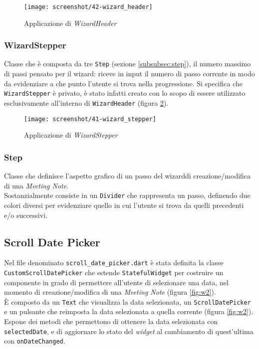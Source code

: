 \begin{figure}[!h] 
    \centering 
    \texttt{[image: screenshot/42-wizard\_header]} 
    \caption{Applicazione di \emph{WizardHeader}}
    \label{fig:wizard-header}
\end{figure}

\subsubsection*{WizardStepper}
\label{subsubsec:wizard-stepper}

Classe che è composta da tre \lstinline{Step} (sezione \ref{subsubsec:step}), il numero massimo di passi pensato per il \gls{wizard}\glsoccur: riceve in input il numero di passo corrente in modo da evidenziare a che punto l'utente si trova nella progressione.
Si specifica che \lstinline{WizardStepper} è privato, è stato infatti creato con lo scopo di essere utilizzato esclusivamente all'interno di \lstinline{WizardHeader} (figura \ref{fig:wizard-stepper}).\\

\begin{figure}[!h] 
    \centering 
    \texttt{[image: screenshot/41-wizard\_stepper]} 
    \caption{Applicazione di \emph{WizardStepper}}
    \label{fig:wizard-stepper}
\end{figure}

\subsubsection*{Step}
\label{subsubsec:step}

Classe che definisce l'aspetto grafico di un passo del \gls{wizard}\glsoccur di creazione/modifica di una \emph{Meeting Note}.\\
Sostanzialmente consiste in un \lstinline{Divider}\cite{site:divider} che rappresenta un passo, definendo due colori diversi per evidenziare quello in cui l'utente si trova da quelli precedenti e/o successivi.

\subsection{Scroll Date Picker}
\label{subsec:scroll-date-picker}

Nel file denominato \lstinline{scroll_date_picker.dart} è stata definita la classe \lstinline{CustomScrollDatePicker} che estende \lstinline{StatefulWidget} per costruire un componente in grado di permettere all'utente di selezionare una data, nel momento di creazione/modifica di una \emph{Meeting Note} (figura \ref{fig:w2}).\\
È composto da un \lstinline{Text}\cite{site:text} che visualizza la data selezionata, un \lstinline{ScrollDatePicker}\cite{site:scroll-date-picker} e un pulsante che reimposta la data selezionata a quella corrente (figura \ref{fig:w2}).\\
Espone dei metodi che permettono di ottenere la data selezionata con \lstinline{selectedDate}, e di aggiornare lo stato del \emph{widget} al cambiamento di quest'ultima con \lstinline{onDateChanged}.

